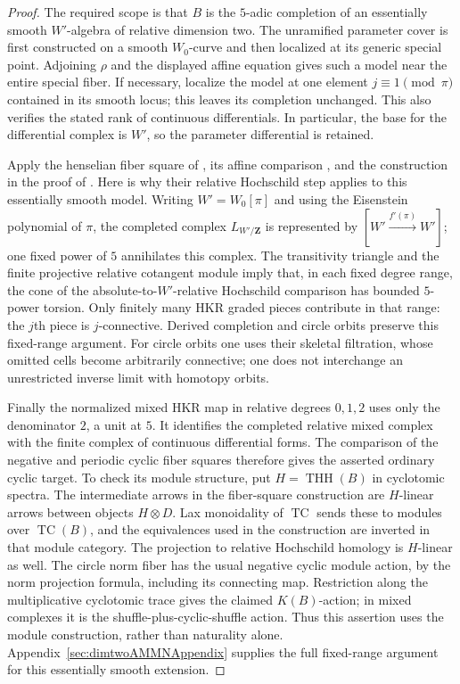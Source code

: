 \documentclass[11pt,a4paper]{article}
\theoremstyle{remark}
\begin{document}
\begin{proof}
The required scope is that $B$ is the $5$-adic completion of an
essentially smooth $W'$-algebra of relative dimension two. The
unramified parameter cover is first constructed on a smooth
$W_0$-curve and then localized at its generic special point.
Adjoining $\rho$ and the displayed affine equation gives such a
model near the entire special fiber. If necessary, localize the
model at one element $j\equiv1\pmod\pi$ contained in its smooth
locus; this leaves its completion unchanged. This also verifies
the stated rank of continuous differentials. In particular,
the base for the differential complex is $W'$, so the parameter
differential is retained.

Apply the henselian fiber square of \cite[Theorem~A]{AMMN}, its
affine comparison \cite[Proposition~4.2]{AMMN}, and the construction
in the proof of \cite[Proposition~4.10]{AMMN}. Here is why their
relative Hochschild step applies to this essentially smooth model.
Writing $W'=W_0[\pi]$ and using the Eisenstein polynomial of
$\pi$, the completed complex $L_{W'/\mathbf Z}$ is represented
by $[W'\xrightarrow{f'(\pi)}W']$; one fixed power of $5$
annihilates this complex. The transitivity triangle and the finite
projective relative cotangent module imply that, in each fixed
degree range, the cone of the absolute-to-$W'$-relative Hochschild
comparison has bounded $5$-power torsion. Only finitely many HKR
graded pieces contribute in that range: the $j$th piece is
$j$-connective. Derived completion and circle orbits preserve this
fixed-range argument. For circle orbits one uses their skeletal
filtration, whose omitted cells become arbitrarily connective;
one does not interchange an unrestricted inverse limit with
homotopy orbits.

Finally the normalized mixed HKR map in relative degrees $0,1,2$
uses only the denominator $2$, a unit at $5$. It identifies the
completed relative mixed complex with the finite complex of
continuous differential forms. The comparison of the negative
and periodic cyclic fiber squares therefore gives the asserted
ordinary cyclic target. To check its module structure, put
$H=\operatorname{THH}(B)$ in cyclotomic spectra. The intermediate
arrows in the fiber-square construction are $H$-linear arrows
between objects $H\otimes D$. Lax monoidality of $\operatorname{TC}$
sends these to modules over $\operatorname{TC}(B)$, and the
equivalences used in the construction are inverted in that module
category. The projection to relative Hochschild homology is
$H$-linear as well. The circle norm fiber has the usual negative
cyclic module action, by the norm projection formula, including
its connecting map. Restriction along the multiplicative
cyclotomic trace gives the claimed $K(B)$-action; in mixed complexes
it is the shuffle-plus-cyclic-shuffle action. Thus this assertion
uses the module construction, rather than naturality alone.
Appendix~\ref{sec:dimtwoAMMNAppendix} supplies the full fixed-range argument for this essentially smooth extension.
\end{proof}
\end{document}
